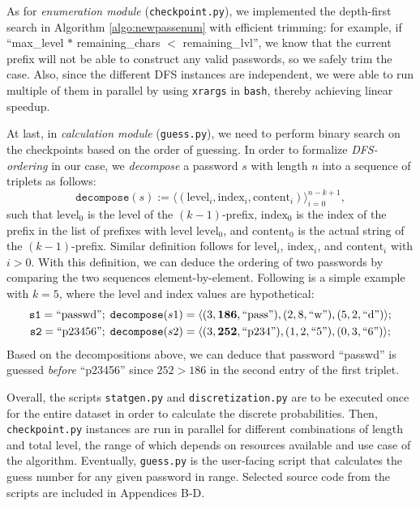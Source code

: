 \documentclass{article} %
\theoremstyle{definition}
\theoremstyle{theorem}
\theoremstyle{remark}
\theoremstyle{remark}
\begin{document}
\par\quad As for \emph{enumeration module} (\texttt{checkpoint.py}), we implemented the depth-first search in Algorithm \ref{algo:newpassenum} with efficient trimming: for example, if ``max\_level $*$ remaining\_chars $<$ remaining\_lvl'', we know that the current prefix will not be able to construct any valid passwords, so we safely trim the case. Also, since the different DFS instances are independent, we were able to run multiple of them in parallel by using \texttt{xrargs} in \texttt{bash}, thereby achieving linear speedup.

\par\quad At last, in \emph{calculation module} (\texttt{guess.py}), we need to perform binary search on the checkpoints based on the order of guessing. In order to formalize \emph{DFS-ordering} in our case, we \emph{decompose} a password $s$ with length $n$ into a sequence of triplets as follows:
\begin{equation}
    \texttt{decompose}(s) := \langle(\text{level}_i, \text{index}_i, \text{content}_i)\rangle_{i=0}^{n-k+1},
\end{equation}
such that \emph{$\text{level}_0$} is the level of the $(k-1)$-prefix, \emph{$\text{index}_0$} is the index of the prefix in the list of prefixes with level $\text{level}_0$, and \emph{$\text{content}_0$} is the actual string of the $(k-1)$-prefix. Similar definition follows for \emph{$\text{level}_i$}, \emph{$\text{index}_i$}, and \emph{$\text{content}_i$} with $i>0$. With this definition, we can deduce the ordering of two passwords by comparing the two sequences element-by-element. Following is a simple example with $k=5$, where the level and index values are hypothetical:
\begin{gather*}
    \texttt{s1} = \text{``passwd''};\; \texttt{decompose}(s1) = \langle(3, {\bf 186}, \text{``pass''}), (2, 8, \text{``w''}), (5, 2, \text{``d''})\rangle;    \\
    \texttt{s2} = \text{``p23456''};\; \texttt{decompose}(s2) = \langle(3, {\bf 252}, \text{``p234''}), (1, 2, \text{``5''}), (0, 3, \text{``6''})\rangle;
\end{gather*}
Based on the decompositions above, we can deduce that password ``passwd'' is guessed \emph{before} ``p23456'' since $252 > 186$ in the second entry of the first triplet.

\par\quad Overall, the scripts \texttt{statgen.py} and \texttt{discretization.py} are to be executed once for the entire dataset in order to calculate the discrete probabilities. Then, \texttt{checkpoint.py} instances are run in parallel for different combinations of length and total level, the range of which depends on resources available and use case of the algorithm. Eventually, \texttt{guess.py} is the user-facing script that calculates the guess number for any given password in range. Selected source code from the scripts are included in Appendices B-D.
\end{document}
